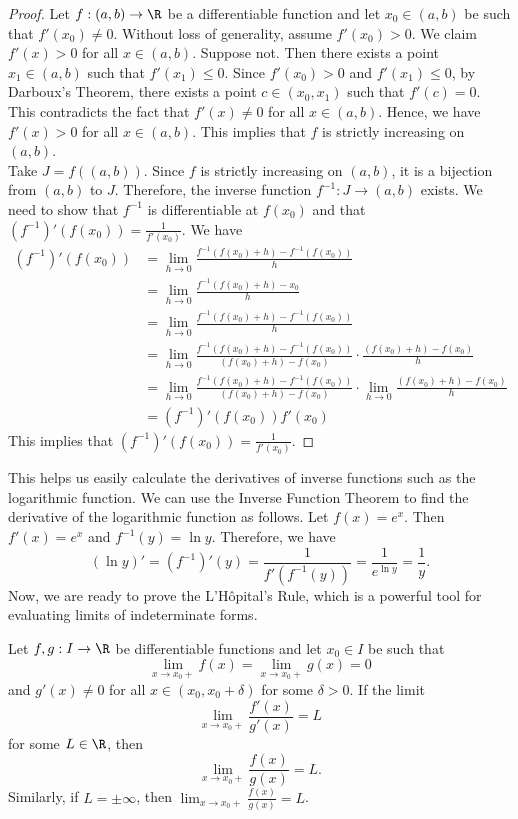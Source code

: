 \documentclass[openany]{book}
\begin{document}
\begin{proof}
    Let $f: (a, b) \to \R$ be a differentiable function and let $x_0 \in (a, b)$ be such that $f'(x_0) \neq 0$. Without loss of generality, assume $f'(x_0) > 0$. We claim $f'(x) > 0$ for all $x \in (a, b)$. Suppose not. Then there exists a point $x_1 \in (a, b)$ such that $f'(x_1) \leq 0$. Since $f'(x_0) > 0$ and $f'(x_1) \leq 0$, by Darboux's Theorem, there exists a point $c \in (x_0, x_1)$ such that $f'(c) = 0$. This contradicts the fact that $f'(x) \neq 0$ for all $x \in (a, b)$. Hence, we have $f'(x) > 0$ for all $x \in (a, b)$. This implies that $f$ is strictly increasing on $(a, b)$. \\
    Take $J = f((a, b))$. Since $f$ is strictly increasing on $(a, b)$, it is a bijection from $(a, b)$ to $J$. Therefore, the inverse function $f^{-1}: J \to (a, b)$ exists. We need to show that $f^{-1}$ is differentiable at $f(x_0)$ and that $(f^{-1})'(f(x_0)) = \frac{1}{f'(x_0)}$. We have
\begin{align*}
    (f^{-1})'(f(x_0)) &= \lim_{h \to 0} \frac{f^{-1}(f(x_0) + h) - f^{-1}(f(x_0))}{h} \\
    &= \lim_{h \to 0} \frac{f^{-1}(f(x_0) + h) - x_0}{h} \\
    &= \lim_{h \to 0} \frac{f^{-1}(f(x_0) + h) - f^{-1}(f(x_0))}{h} \\
    &= \lim_{h \to 0} \frac{f^{-1}(f(x_0) + h) - f^{-1}(f(x_0))}{(f(x_0) + h) - f(x_0)} \cdot \frac{(f(x_0) + h) - f(x_0)}{h} \\
    &= \lim_{h \to 0} \frac{f^{-1}(f(x_0) + h) - f^{-1}(f(x_0))}{(f(x_0) + h) - f(x_0)} \cdot \lim_{h \to 0} \frac{(f(x_0) + h) - f(x_0)}{h} \\
    &= (f^{-1})'(f(x_0)) f'(x_0)
\end{align*}
This implies that $(f^{-1})'(f(x_0)) = \frac{1}{f'(x_0)}$.
\end{proof}
This helps us easily calculate the derivatives of inverse functions such as the logarithmic function. We can use the Inverse Function Theorem to find the derivative of the logarithmic function as follows. Let $f(x) = e^x$. Then $f'(x) = e^x$ and $f^{-1}(y) = \ln y$. Therefore, we have
\[
    (\ln y)' = (f^{-1})'(y) = \frac{1}{f'(f^{-1}(y))} = \frac{1}{e^{\ln y}} = \frac{1}{y}.
\]
Now, we are ready to prove the L'Hôpital's Rule, which is a powerful tool for evaluating limits of indeterminate forms.
\begin{mytheorem}
    Let $f, g: I \to \R$ be differentiable functions and let $x_0 \in I$ be such that 
    \[ \lim_{x \to x_0+} f(x) = \lim_{x \to x_0+} g(x) = 0 \]
    and $g'(x) \neq 0$ for all $x \in (x_0, x_0 + \delta)$ for some $\delta > 0$. If the limit
    \[
        \lim_{x \to x_0+} \frac{f'(x)}{g'(x)} = L
    \]
    for some $L \in \R$, then
    \[
        \lim_{x \to x_0+} \frac{f(x)}{g(x)} = L.
    \]
    Similarly, if $L = \pm \infty$, then $\lim_{x \to x_0+} \frac{f(x)}{g(x)} = L$.
\end{mytheorem}
\end{document}
